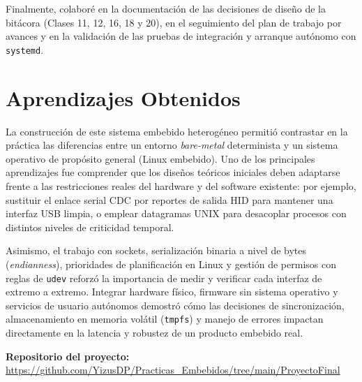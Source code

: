 \documentclass[conference]{IEEEtran}
\begin{document}
Finalmente, colaboré en la documentación de las decisiones de diseño de la bitácora (Clases 11, 12, 16, 18 y 20), en el seguimiento del plan de trabajo por avances y en la validación de las pruebas de integración y arranque autónomo con \texttt{systemd}.

\section*{Aprendizajes Obtenidos}

La construcción de este sistema embebido heterogéneo permitió contrastar en la práctica las diferencias entre un entorno \textit{bare-metal} determinista y un sistema operativo de propósito general (Linux embebido). Uno de los principales aprendizajes fue comprender que los diseños teóricos iniciales deben adaptarse frente a las restricciones reales del hardware y del software existente: por ejemplo, sustituir el enlace serial CDC por reportes de salida HID para mantener una interfaz USB limpia, o emplear datagramas UNIX para desacoplar procesos con distintos niveles de criticidad temporal.

Asimismo, el trabajo con sockets, serialización binaria a nivel de bytes (\textit{endianness}), prioridades de planificación en Linux y gestión de permisos con reglas de \texttt{udev} reforzó la importancia de medir y verificar cada interfaz de extremo a extremo. Integrar hardware físico, firmware sin sistema operativo y servicios de usuario autónomos demostró cómo las decisiones de sincronización, almacenamiento en memoria volátil (\texttt{tmpfs}) y manejo de errores impactan directamente en la latencia y robustez de un producto embebido real.

\vspace{0.3cm}
\noindent\textbf{Repositorio del proyecto:} \\
\url{https://github.com/YizusDP/Practicas_Embebidos/tree/main/ProyectoFinal}
\end{document}
